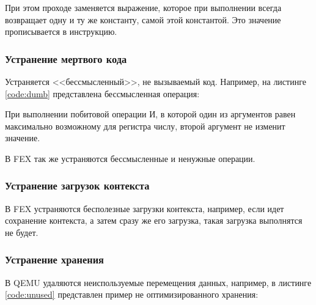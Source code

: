 При этом проходе заменяется выражение, которое при выполнении всегда возвращает одну и ту же константу, самой этой константой. Это значение прописывается в инструкцию.

\subsubsection{Устранение мертвого кода}

Устраняется <<бессмысленный>>, не вызываемый код.
Например, на листинге \ref{code:dumb} представлена бессмысленная операция:

При выполнении побитовой операции И, в которой один из аргументов равен максимально возможному для регистра числу, второй аргумент не изменит значение.

В FEX так же устраняются бессмысленные и ненужные операции.

\subsubsection{Устранение загрузок контекста}

В FEX устраняются бесполезные загрузки контекста, например, если идет сохранение контекста, а затем сразу же его загрузка, такая загрузка выполнятся не будет. 

\subsubsection{Устранение хранения}

В QEMU удаляются неиспользуемые перемещения данных, например, в листинге \ref{code:unused} представлен пример не оптимизированного хранения:


